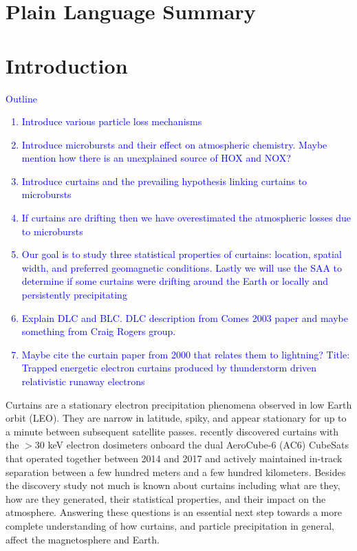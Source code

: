 \documentclass[draft]{agujournal2019}
\begin{document}
\section{Plain Language Summary}

\section{Introduction}
\textcolor{blue}{
Outline
\begin{enumerate}
\item Introduce various particle loss mechanisms
\item Introduce microbursts and their effect on atmospheric chemistry. Maybe mention how there is an unexplained source of HOX and NOX?
\item Introduce curtains and the prevailing hypothesis linking curtains to microbursts
\item If curtains are drifting then we have overestimated the atmospheric losses due to microbursts 
\item Our goal is to study three statistical properties of curtains: location, spatial width, and preferred geomagnetic conditions. Lastly we will use the SAA to determine if some curtains were drifting around the Earth or locally and persistently precipitating
\item Explain DLC and BLC. DLC description from Comes 2003 paper and maybe something from Craig Rogers group.
\item Maybe cite the curtain paper from 2000 that relates them to lightning? Title: Trapped energetic electron curtains produced by thunderstorm driven relativistic runaway electrons
\end{enumerate}
}

Curtains are a stationary electron precipitation phenomena observed in low Earth orbit (LEO). They are narrow in latitude, spiky, and appear stationary for up to a minute between subsequent satellite passes.  recently discovered curtains with the $> 30$ keV electron dosimeters onboard the dual AeroCube-6 (AC6) CubeSats that operated together between 2014 and 2017 and actively maintained in-track separation between a few hundred meters and a few hundred kilometers. Besides the  discovery study not much is known about curtains including what are they, how are they generated, their statistical properties, and their impact on the atmosphere. Answering these questions is an essential next step towards a more complete understanding of how curtains, and particle precipitation in general, affect the magnetosphere and Earth.
\end{document}
